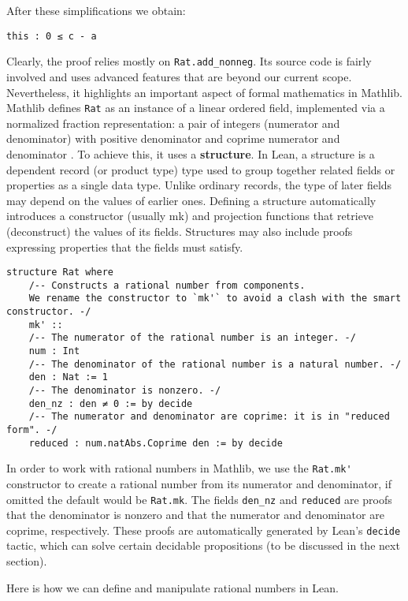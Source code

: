 After these simplifications we obtain:
\begin{lstlisting}[language=lean]
  this : 0 ≤ c - a
\end{lstlisting}
Clearly, the proof relies mostly on \lstinline[language=lean]|Rat.add_nonneg|. 
Its source code is fairly involved and uses advanced features 
that are beyond our current scope. Nevertheless, it highlights 
an important aspect of formal mathematics in Mathlib.
Mathlib defines \lstinline[language=lean]|Rat| as an instance of 
a linear ordered field, implemented via a normalized fraction 
representation: a pair of integers (numerator and denominator) 
with positive denominator and coprime numerator and denominator \cite{mathlibdoc}. 
To achieve this, it uses a \textbf{structure}. In Lean, a structure is a dependent record 
(or product type) type  used to group together related fields or properties as a single data type.
Unlike ordinary records, the type of later fields may depend on the values of earlier ones.
Defining a structure automatically introduces a constructor (usually mk) and projection 
functions that retrieve (deconstruct) the values of its fields.
Structures may also include proofs expressing properties that the fields must satisfy.
\begin{lstlisting}[language=lean]
  structure Rat where
    /-- Constructs a rational number from components.
    We rename the constructor to `mk'` to avoid a clash with the smart constructor. -/
    mk' ::
    /-- The numerator of the rational number is an integer. -/
    num : Int
    /-- The denominator of the rational number is a natural number. -/
    den : Nat := 1
    /-- The denominator is nonzero. -/
    den_nz : den ≠ 0 := by decide
    /-- The numerator and denominator are coprime: it is in "reduced form". -/
    reduced : num.natAbs.Coprime den := by decide
\end{lstlisting}
In order to work with rational numbers in Mathlib, we use the
\lstinline[language=lean]|Rat.mk'| constructor to create a rational number from
its numerator and denominator, if omitted the default would be \lstinline[language=lean]|Rat.mk|.
The fields \lstinline[language=lean]|den_nz| and \lstinline[language=lean]|reduced| are proofs that 
the denominator is nonzero and that the numerator and denominator are coprime, respectively. 
These proofs are automatically generated by Lean's \lstinline[language=lean]|decide| tactic, which can 
solve certain decidable propositions (to be discussed in the next section).
\begin{example} 
  Here is how we can define and manipulate rational numbers in Lean.
\end{example}
